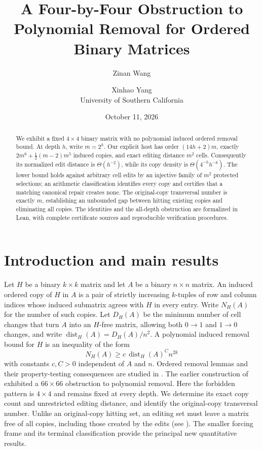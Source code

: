 \documentclass[11pt]{article}
\title{A Four-by-Four Obstruction to Polynomial Removal for Ordered Binary Matrices}
\author{Zinan Wang \and Xinhao Yang\\University of Southern California}
\date{October 11, 2026}
\newcommand{\dist}{\operatorname{dist}}
\begin{document}
\maketitle

\begin{abstract}
We exhibit a fixed $4\times4$ binary matrix with no polynomial induced
ordered removal bound. At depth $h$, write $m=2^h$. Our explicit host has
order $(14h+2)m$, exactly $2m^6+\frac12(m-2)m^5$ induced copies,
and exact editing distance $m^2$ cells. Consequently its normalized
edit distance is $\Theta(h^{-2})$, while its copy density is
$\Theta(4^{-h}h^{-8})$. The lower bound holds against arbitrary cell
edits by an injective family of $m^2$ protected selections; an
arithmetic classification identifies every copy and certifies that a
matching canonical repair creates none. The original-copy transversal
number is exactly $m$, establishing an unbounded gap between hitting
existing copies and eliminating all copies. The identities and the
all-depth obstruction are formalized in Lean, with complete certificate
sources and reproducible verification procedures.
\end{abstract}

\section{Introduction and main results}
Let $H$ be a binary $k\times k$ matrix and let $A$ be a binary $n\times n$
matrix. An induced ordered copy of $H$ in $A$ is a pair of strictly
increasing $k$-tuples of row and column indices whose induced submatrix
agrees with $H$ in every entry. Write $N_H(A)$ for the number of such
copies. Let $D_H(A)$ be the minimum number of cell changes that turn $A$
into an $H$-free matrix, allowing both $0\to1$ and $1\to0$ changes, and
write $\dist_H(A)=D_H(A)/n^2$.
A polynomial induced removal bound for $H$ is an inequality of the form
\begin{equation}\label{eq:removal-bound}
 N_H(A)\ge c\,\dist_H(A)^C n^{2k}
\end{equation}
with constants $c,C>0$ independent of $A$ and $n$. Ordered removal lemmas
and their property-testing consequences are studied in \cite{ABF,ABE20}.
The earlier construction of \cite{OAI} exhibited a $66\times66$
obstruction to polynomial removal. Here the forbidden pattern is
$4\times4$ and remains fixed at every depth. We determine its exact
copy count and unrestricted editing distance, and identify the original-copy
transversal number. Unlike an original-copy hitting set, an editing set
must leave a matrix free of all copies, including those created by the
edits (see \cite{ABE20}). The smaller forcing frame and its terminal
classification provide the principal new quantitative results.
\end{document}
